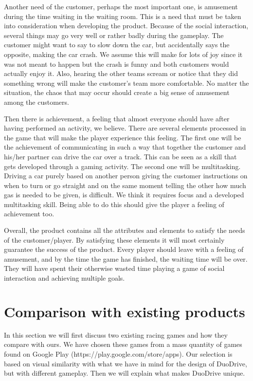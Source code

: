 \documentclass[11pt,twoside,a4paper]{article}
\begin{document}
Another need of the customer, perhaps the most important one, is amusement during the time waiting in the waiting room. This is a need that must be taken into consideration when developing the product. Because of the social interaction, several things may go very well or rather badly during the gameplay. The customer might want to say to slow down the car, but accidentally says the opposite, making the car crash. We assume this will make for lots of joy since it was not meant to happen but the crash is funny and both customers would actually enjoy it. Also, hearing the other teams scream or notice that they did something wrong will make the customer's team more comfortable. No matter the situation, the chaos that may occur should create a big sense of amusement among the customers.

Then there is achievement, a feeling that almost everyone should have after having performed an activity, we believe. There are several elements processed in the game that will make the player experience this feeling. The first one will be the achievement of communicating in such a way that together the customer and his/her partner can drive the car over a track. This can be seen as a skill that gets developed through a gaming activity. The second one will be multitasking. Driving a car purely based on another person giving the customer instructions on when to turn or go straight and on the same moment telling the other how much gas is needed to be given, is difficult. We think it requires focus and a developed multitasking skill. Being able to do this should give the player a feeling of achievement too.

Overall, the product contains all the attributes and elements to satisfy the needs of the customer/player. By satisfying these elements it will most certainly guarantee the success of the product. Every player should leave with a feeling of amusement, and by the time the game has finished, the waiting time will be over. They will have spent their otherwise wasted time playing a game of social interaction and achieving multiple goals.


\section{Comparison with existing products}
In this section we will first discuss two existing racing games and how they compare with ours. We have chosen these games from a mass quantity of games found on Google Play (https://play.google.com/store/apps). Our selection is based on visual similarity with what we have in mind for the design of DuoDrive, but with different gameplay. Then we will explain what makes DuoDrive unique.
\end{document}
